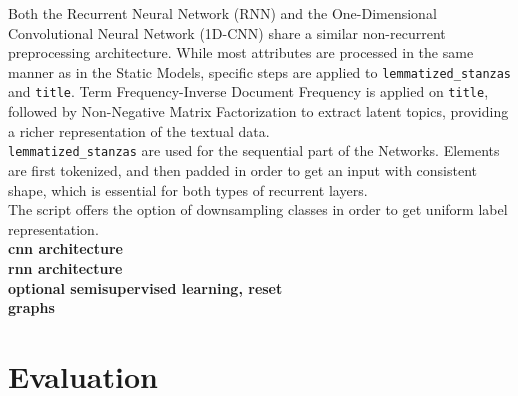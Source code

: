
Both the Recurrent Neural Network (RNN) and the One-Dimensional Convolutional
Neural Network (1D-CNN) share a similar non-recurrent preprocessing
architecture. While most attributes are processed in the same manner as in
the Static Models, specific steps are applied to \texttt{lemmatized\_stanzas}
and \texttt{title}.
Term Frequency-Inverse Document Frequency is applied on \texttt{title},
followed by Non-Negative Matrix Factorization
to extract latent topics, providing a richer representation of the
textual data.\\

\texttt{lemmatized\_stanzas} are used for the sequential part of the Networks.
Elements are first tokenized, and then padded in order to
get an input with consistent shape, which is essential for both types of
recurrent layers.\\

The script offers the option of downsampling classes in order to get
uniform label representation.\\

\textbf{cnn architecture}\\

\textbf{rnn architecture}\\

\textbf{optional semisupervised learning, reset}\\

\textbf{graphs}



\section*{Evaluation}
